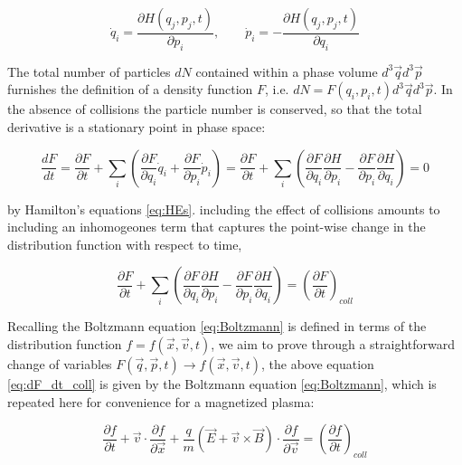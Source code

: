 \documentclass[11pt,titlepage]{report}
\begin{document}


\begin{equation}\label{eq:HEs}
\dot{q}_i = \frac{\partial H(q_j,p_j,t)}{\partial p_i} , \qquad \dot{p}_i = -\frac{\partial H(q_j,p_j,t)}{\partial q_i}
\end{equation}

\noindent The total number of particles $dN$ contained within a phase volume $d^3\vec{q}d^3\vec{p}$ furnishes the definition of a density function $F$, i.e. $dN = F(q_i,p_i,t) d^3\vec{q}d^3\vec{p}$. In the absence of collisions the particle number is conserved, so that the total derivative is a stationary point in phase space:

$$\frac{dF}{dt} = \frac{\partial F}{\partial t} + \sum_i \left(\frac{\partial F}{\partial q_i} \dot{q}_i + \frac{\partial F}{\partial p_i} \dot{p}_i\right) = \frac{\partial F}{\partial t} + \sum_i \left(\frac{\partial F}{\partial q_i}\frac{\partial H}{\partial p_i} - \frac{\partial F}{\partial p_i}\frac{\partial H}{\partial q_i}\right) = 0$$

\noindent by Hamilton's equations \eqref{eq:HEs}. including the effect of collisions amounts to including an inhomogeones term that captures the point-wise change in the distribution function with respect to time,

\begin{equation}\label{eq:dF_dt_coll}
\frac{\partial F}{\partial t} + \sum_i \left(\frac{\partial F}{\partial q_i}\frac{\partial H}{\partial p_i} - \frac{\partial F}{\partial p_i}\frac{\partial H}{\partial q_i}\right) = \left(\frac{\partial F}{\partial t}\right)_{coll}
\end{equation}

\noindent Recalling the Boltzmann equation \eqref{eq:Boltzmann} is defined in terms of the distribution function $f = f(\vec{x},\vec{v},t)$, we aim to prove through a straightforward change of variables $F(\vec{q},\vec{p},t) \rightarrow f(\vec{x},\vec{v},t)$, the above equation \eqref{eq:dF_dt_coll} is given by the Boltzmann equation \eqref{eq:Boltzmann}, which is repeated here for convenience for a magnetized plasma:

\begin{equation}\label{eq:Boltzmann2}
\frac{\partial f}{\partial t} + \vec{v}\cdot\frac{\partial f}{\partial \vec{x}} + \frac{q}{m}\left(\vec{E} + \vec{v}\times\vec{B}\right)\cdot \frac{\partial f}{\partial \vec{v}} = \left(\frac{\partial f}{\partial t}\right)_{coll}
\end{equation}
\end{document}
